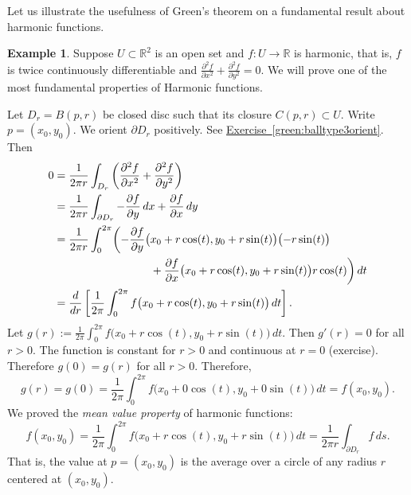 \documentclass[12pt]{book}
\newcommand{\R}{{\mathbb{R}}}
\newcommand{\myindex}[1]{#1\index{#1}}
\theoremstyle{plain}
\theoremstyle{remark}
\theoremstyle{definition}
\theoremstyle{exercise}
\theoremstyle{example}
\newtheorem{example}[thm]{Example}
\newcommand{\exerciseref}[1]{\hyperref[#1]{Exercise~\ref*{#1}}}
\begin{document}
Let us illustrate the usefulness of Green's theorem on a fundamental result
about harmonic functions.

\begin{example}
Suppose $U \subset \R^2$ is an open set and
$f \colon U \to \R$ is harmonic, that is, $f$ is twice continuously
differentiable and
$\frac{\partial^2 f}{\partial x^2} +
\frac{\partial^2 f}{\partial y^2} = 0$.
We will prove one of the most fundamental properties of Harmonic functions.

Let $D_r = B(p,r)$ be closed disc such that its closure $C(p,r) \subset U$.  Write
$p = (x_0,y_0)$.  We orient
$\partial D_r$ positively.  See \exerciseref{green:balltype3orient}.
Then
\begin{equation*}
\begin{split}
0
& =
\frac{1}{2\pi r}
\int_{D_r}
\left(
\frac{\partial^2 f}{\partial x^2} +
\frac{\partial^2 f}{\partial y^2}
\right)
\\
& 
=
\frac{1}{2\pi r}
\int_{\partial D_r}
- \frac{\partial f}{\partial y} \, dx + 
\frac{\partial f}{\partial x} \, dy
\\
&
=
\frac{1}{2\pi r}
\int_0^{2\pi}
\biggl(
- \frac{\partial f}{\partial y} \bigl(x_0+r\cos(t),y_0+r\sin(t)\bigr) \bigl(-r\sin(t)\bigr)
\\
& \hspace{1.2in}
+ \frac{\partial f}{\partial x} \bigl(x_0+r\cos(t),y_0+r\sin(t)\bigr) r\cos(t)
\biggr) \, dt
\\
&
=
\frac{d}{dr}
\left[
\frac{1}{2\pi}
\int_0^{2\pi}
f\bigl(x_0+r\cos(t),y_0+r\sin(t)\bigr) \, dt
\right] .
\end{split}
\end{equation*}
Let $g(r) := 
\frac{1}{2\pi}
\int_0^{2\pi}
f\bigl(x_0+r\cos(t),y_0+r\sin(t)\bigr) \, dt$.  Then $g'(r) = 0$ for all
$r > 0$.
The function is constant for $r >0$ and continuous at $r=0$ (exercise).
Therefore $g(0) = g(r)$ for all $r > 0$.  Therefore,
\begin{equation*}
g(r) = g(0) = 
\frac{1}{2\pi}
\int_0^{2\pi}
f\bigl(x_0+0\cos(t),y_0+0\sin(t)\bigr) \, dt
=
f(x_0,y_0).
\end{equation*}
We
proved the \emph{\myindex{mean value property}} of harmonic functions:
\begin{equation*}
f(x_0,y_0) = 
\frac{1}{2\pi}
\int_0^{2\pi}
f\bigl(x_0+r\cos(t),y_0+r\sin(t)\bigr) \, dt 
=
\frac{1}{2\pi r}
\int_{\partial D_r} f \, ds .
\end{equation*}
That is, the value at $p = (x_0,y_0)$ is the average over a circle of any
radius $r$ centered at $(x_0,y_0)$.
\end{example}
\end{document}
